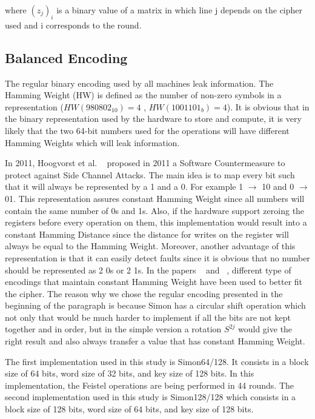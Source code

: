 \documentclass[conference]{IEEEtran}
\begin{document}
where $(z_{j})_{i}$ is a binary value of a matrix in which line j depends on the cipher used and i corresponds to the round.

\subsection{Balanced Encoding}

The regular binary encoding used by all machines leak information. The Hamming Weight (HW) is defined as the number of non-zero symbols in a representation ($HW(980802_{10}) = 4$ , $HW(1001101_{b}) = 4$). It is obvious that in the binary representation used by the hardware to store and compute, it is very likely that the two 64-bit numbers used for the operations will have different Hamming Weights which will leak information.

In 2011, Hoogvorst et al.  ~\cite{Hoogvorst} proposed in 2011 a Software Countermeasure to protect against Side Channel Attacks. The main idea is to map every bit such that it will always be represented by a 1 and a 0. For example 1 $\rightarrow$ 10 and 0 $\rightarrow$ 01. This representation assures constant Hamming Weight since all numbers will contain the same number of 0s and 1s. Also, if the hardware support zeroing the registers before every operation on them, this implementation would result into a constant Hamming Distance since the distance for writes on the register will always be equal to the Hamming Weight. Moreover, another advantage of this representation is that it can easily detect faults since it is obvious that no number should be represented as 2 0s or 2 1s. In the papers ~\cite{BEPrince} and ~\cite{ServantAES}, different type of encodings that maintain constant Hamming Weight have been used to better fit the cipher. The reason why we chose the regular encoding presented in the beginning of the paragraph is because Simon has a circular shift operation which not only that would be much harder to implement if all the bits are not kept together and in order, but in the simple version a rotation $S^{2j}$ would give the right result and also always transfer a value that has constant Hamming Weight.

The first implementation used in this study is Simon64/128. It consists in a block size of 64 bits, word size of 32 bits, and key size of 128 bits. In this implementation, the Feistel operations are being performed in 44 rounds. The second implementation used in this study is Simon128/128 which consists in a block size of 128 bits, word size of 64 bits, and key size of 128 bits.
\end{document}
